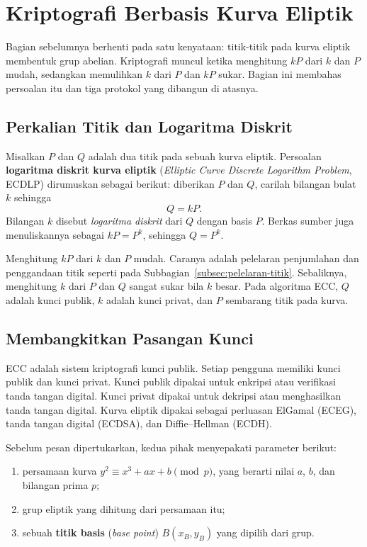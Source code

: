 \section{Kriptografi Berbasis Kurva Eliptik}
\label{sec:kriptografi-ec}

Bagian sebelumnya berhenti pada satu kenyataan: titik-titik pada kurva eliptik
membentuk grup abelian. Kriptografi muncul ketika menghitung $kP$ dari $k$ dan
$P$ mudah, sedangkan memulihkan $k$ dari $P$ dan $kP$ sukar. Bagian ini membahas
persoalan itu dan tiga protokol yang dibangun di atasnya.

\subsection{Perkalian Titik dan Logaritma Diskrit}
\label{subsec:ecdlp}

Misalkan $P$ dan $Q$ adalah dua titik pada sebuah kurva eliptik. Persoalan
\textbf{logaritma diskrit kurva eliptik} (\textit{Elliptic Curve Discrete
Logarithm Problem}, ECDLP) dirumuskan sebagai berikut: diberikan $P$ dan $Q$,
carilah bilangan bulat $k$ sehingga
\begin{equation}
Q = kP .
\label{eq:ecdlp}
\end{equation}
Bilangan $k$ disebut \emph{logaritma diskrit} dari $Q$ dengan basis $P$.
Berkas sumber juga menuliskannya sebagai $kP = P^k$, sehingga $Q = P^k$.

Menghitung $kP$ dari $k$ dan $P$ mudah. Caranya adalah pelelaran penjumlahan
dan penggandaan titik seperti pada Subbagian~\ref{subsec:pelelaran-titik}.
Sebaliknya, menghitung $k$ dari $P$ dan $Q$ sangat sukar bila $k$ besar. Pada
algoritma ECC, $Q$ adalah kunci publik, $k$ adalah kunci privat, dan $P$
sembarang titik pada kurva.

\subsection{Membangkitkan Pasangan Kunci}
\label{subsec:kunci-ecc}

ECC adalah sistem kriptografi kunci publik. Setiap pengguna memiliki kunci
publik dan kunci privat. Kunci publik dipakai untuk enkripsi atau verifikasi
tanda tangan digital. Kunci privat dipakai untuk dekripsi atau menghasilkan
tanda tangan digital. Kurva eliptik dipakai sebagai perluasan ElGamal
(ECEG), tanda tangan digital (ECDSA), dan Diffie--Hellman (ECDH).

Sebelum pesan dipertukarkan, kedua pihak menyepakati parameter berikut:
\begin{enumerate}
    \item persamaan kurva $y^2 \equiv x^3 + ax + b \pmod{p}$, yang berarti
          nilai $a$, $b$, dan bilangan prima $p$;
    \item grup eliptik yang dihitung dari persamaan itu;
    \item sebuah \textbf{titik basis} (\textit{base point}) $B(x_B, y_B)$ yang
          dipilih dari grup.
\end{enumerate}

